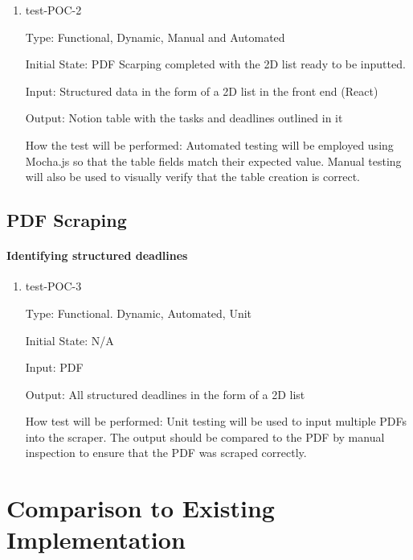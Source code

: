\documentclass[12pt, titlepage]{article}
\begin{document}
\begin{enumerate}

\item{test-POC-2\\}

Type: Functional, Dynamic, Manual and Automated

Initial State: PDF Scarping completed with the 2D list ready to be inputted. 

Input: Structured data in the form of a 2D list in the front end (React) 

Output: Notion table with the tasks and deadlines outlined in it 

How the test will be performed: Automated testing will be employed using Mocha.js so that the table fields match their expected value. Manual testing will also be used to visually verify that the table creation is correct. 

\end{enumerate}

\subsection{PDF Scraping}

\paragraph{Identifying structured deadlines}

\begin{enumerate}

\item{test-POC-3\\}

Type: Functional. Dynamic, Automated, Unit

Initial State: N/A

Input: PDF 

Output: All structured deadlines in the form of a 2D list

How test will be performed: Unit testing will be used to input multiple PDFs into the scraper. The output should be compared to the PDF by manual inspection to ensure that the PDF was scraped correctly. 

\end{enumerate}

	
\section{Comparison to Existing Implementation}
\end{document}
